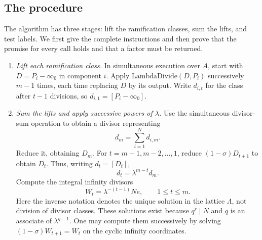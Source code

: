 \subsection{The procedure}

The algorithm has three stages: lift the ramification classes, sum the
lifts, and test labels.  We first give the complete instructions and then
prove that the promise for every call holds and that a factor must be
returned.

\begin{enumerate}
\item \textit{Lift each ramification class.}
In simultaneous execution over $A$, start with
$D=P_i-\infty_0$ in component $i$.
Apply $\mathrm{LambdaDivide}(D,P_i)$ successively $m-1$ times, each time
replacing $D$ by its output.  Write $d_{i,t}$ for the class after $t-1$
divisions, so $d_{i,1}=[P_i-\infty_0]$.

\item \textit{Sum the lifts and apply successive powers of $\lambda$.}
Use the simultaneous divisor-sum operation to obtain a divisor representing
\[
                              d_m=\sum_{i=1}^N d_{i,m}.
\]
Reduce it, obtaining $D_m$.
For $t=m-1,m-2,\ldots,1$, reduce
$(1-\sigma)D_{t+1}$ to obtain $D_t$.  Thus, writing $d_t=[D_t]$,
\begin{equation}
                           d_t=\lambda^{m-t}d_m.
\label{odd:downward-chain}
\end{equation}
Compute the integral infinity divisors
\begin{equation}
                           W_t=\lambda^{-(t-1)}Ne,
                           \qquad 1\le t\le m.
\label{odd:W}
\end{equation}
Here the inverse notation denotes the unique solution in the lattice
$\Lambda$, not division of divisor classes.  These solutions exist because
$q^r\mid N$ and $q$ is an associate of $\lambda^{q-1}$.
One may compute them successively by solving
$(1-\sigma)W_{t+1}=W_t$ on the cyclic infinity coordinates.


\end{enumerate}
